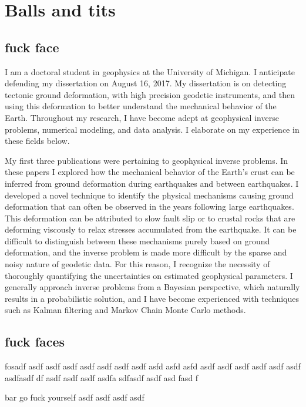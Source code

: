 \documentclass[letterpaper,12pt,oneside]{book}
\begin{document}
\mainmatter

\chapter{Balls and tits}

\section{fuck face}
I am a doctoral student in geophysics at the University of Michigan. I anticipate defending my dissertation on August 16, 2017. My dissertation is on detecting tectonic ground deformation, with high precision geodetic instruments, and then using this deformation to better understand the mechanical behavior of the Earth. Throughout my research, I have become adept at geophysical inverse problems, numerical modeling, and data analysis. I elaborate on my experience in these fields below.

My first three publications were pertaining to geophysical inverse problems. In these papers I explored how the mechanical behavior of the Earth's crust can be inferred from ground deformation during earthquakes and between earthquakes. I developed a novel technique to identify the physical mechanisms causing ground deformation that can often be observed in the years following large earthquakes. This deformation can be attributed to slow fault slip or to crustal rocks that are deforming viscously to relax stresses accumulated from the earthquake. It can be difficult to distinguish between these mechanisms purely based on ground deformation, and the inverse problem is made more difficult by the sparse and noisy nature of geodetic data. For this reason, I recognize the necessity of thoroughly quantifying the uncertainties on estimated geophysical parameters. I generally approach inverse problems from a Bayesian perspective, which naturally results in a probabilistic solution, and I have become experienced with techniques such as Kalman filtering and Markov Chain Monte Carlo methods.


\section{fuck faces}
fosadf asdf asdf  asdf asdf asdf asdf asdf asfd asfd asfd asdf asdf asdf asdf asdf asdf asdfasdf df asdf asdf asdf asdfa sdfasdf asdf asd fasd f

bar
go fuck yourself
asdf
\newpage
asdf 
asdf
asdf
\end{document}

